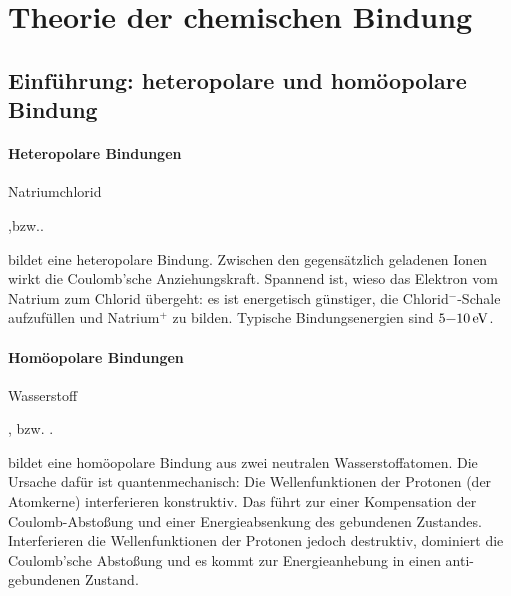 \clearpage
\section{Theorie der chemischen Bindung}
\subsection{Einführung: heteropolare und homöopolare Bindung}
    \paragraph{Heteropolare Bindungen}
    Natriumchlorid
    \begin{center}
        ,\quad bzw.\quad {}.
    \end{center}
    bildet eine heteropolare Bindung.
    Zwischen den gegensätzlich geladenen Ionen wirkt die Coulomb'sche Anziehungskraft.     
    Spannend ist, wieso das Elektron vom Natrium zum Chlorid übergeht: 
    es ist energetisch günstiger, die Chlorid${}^-$-Schale aufzufüllen und Natrium${}^+$ zu bilden. 
    Typische Bindungsenergien sind $\SI[parse-numbers=false]{5\text-10}{\electronvolt}$.

    \paragraph{Homöopolare Bindungen}
    Wasserstoff
    \begin{center}
        , \quad bzw. \quad{}.
    \end{center}
    bildet eine homöopolare Bindung aus zwei neutralen Wasserstoffatomen.
    Die Ursache dafür ist quantenmechanisch: 
    Die Wellenfunktionen der Protonen (der Atomkerne) interferieren konstruktiv.
    Das führt zur einer Kompensation der Coulomb-Abstoßung und einer Energieabsenkung des gebundenen Zustandes.\\

    Interferieren die Wellenfunktionen der Protonen jedoch destruktiv, dominiert die Coulomb'sche Abstoßung und es kommt zur Energieanhebung in einen anti-gebundenen Zustand.

